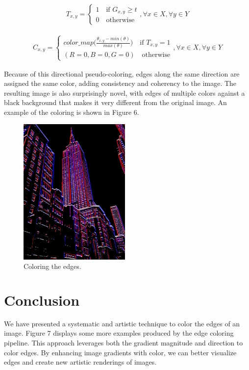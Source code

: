 \documentclass[runningheads]{llncs}
\begin{document}
\begin{align}
T_{x,y} = \left\{
  \begin{array}{lr}
    1 \quad \text{if  } G_{x,y} \geq t \\
    0 \quad \text{otherwise}
  \end{array}
\right.
, \forall x \in X, \forall y \in Y
\end{align}

\begin{align}
C_{x,y} = \left\{
  \begin{array}{lr}
    color\_map \Big(\frac{\theta_{x,y} - min(\theta)}{max(\theta)} \Big) \quad \text{if  } T_{x,y} = 1 \\
    (R=0, B=0, G=0) \quad \text{otherwise}
  \end{array}
\right.
, \forall x \in X, \forall y \in Y
\end{align}

Because of this directional pseudo-coloring, edges along the same direction are assigned the same color, adding consistency and coherency to the image. The resulting image is also surprisingly novel, with edges of multiple colors against a black background that makes it very different from the original image. An example of the coloring is shown in Figure 6.

\begin{figure}[h!]
\centering
\includegraphics[height=7.3cm]{images/edge_color_1.jpg}
\caption{Coloring the edges.}
\label{fig:example}
\end{figure}

\section{Conclusion}

We have presented a systematic and artistic technique to color the edges of an image. Figure 7 displays some more examples produced by the edge coloring pipeline. This approach leverages both the gradient magnitude and direction to color edges. By enhancing image gradients with color, we can better visualize edges and create new artistic renderings of images.
\end{document}
